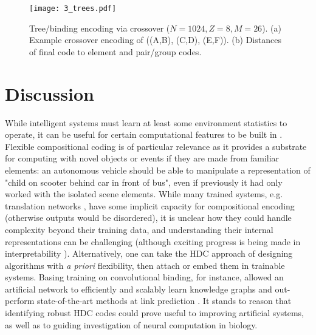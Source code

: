 \documentclass{article}
\begin{document}
\begin{figure}
\label{fig:3}
  \centering
  \texttt{[image: 3\_trees.pdf]}
  \caption{Tree/binding encoding via crossover ($N=1024, Z=8, M=26$). (a) Example crossover encoding of ((A,B), (C,D), (E,F)). (b) Distances of final code to element and pair/group codes.}
\end{figure}
\section{Discussion}

While intelligent systems must learn at least some environment statistics to operate, it can be useful for certain computational features to be built in \cite{Zador:2019}. Flexible compositional coding is of particular relevance as it provides a substrate for computing with novel objects or events if they are made from familiar elements: an autonomous vehicle should be able to manipulate a representation of "child on scooter behind car in front of bus", even if previously it had only worked with the isolated scene elements. While many trained systems, e.g. translation networks \cite{Bahdanau:2014, Luong:2015, Wu:2016}, have some implicit capacity for compositional encoding (otherwise outputs would be disordered), it is unclear how they could handle complexity beyond their training data, and understanding their internal representations can be challenging \cite{Lipton:2016} (although exciting progress is being made in interpretability \cite{Zeiler:2014, Montavon:2018}). Alternatively, one can take the HDC approach of designing algorithms with \textit{a priori} flexibility, then attach or embed them in trainable systems. Basing training on convolutional binding, for instance, allowed an artificial network to efficiently and scalably learn knowledge graphs and out-perform state-of-the-art methods at link prediction \cite{Nickel:2016}. It stands to reason that identifying robust HDC codes could prove useful to improving artificial systems, as well as to guiding investigation of neural computation in biology.
\end{document}
